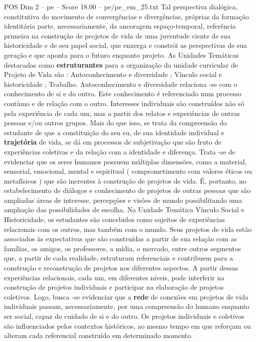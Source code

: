 \begin{textsample}{POS Dim 2 – pe – Score 18.00 – pe/pe\_em\_25.txt}
Tal perspectiva dialógica, constitutiva do movimento de convergências e divergências, próprias da formação identitária parte, necessariamente, da ancoragem espaço-temporal, referência primeira na construção de projetos de vida de uma juventude ciente de sua historicidade e de seu papel social, que enxerga e constrói as perspectivas de sua geração e que aponta para o futuro enquanto projeto.
As Unidades Temáticas destacadas como \textbf{estruturantes} para a organização da unidade curricular de Projeto de Vida são : Autoconhecimento e diversidade ; Vínculo social e historicidade ; Trabalho.
Autoconhecimento e diversidade relaciona -se com o conhecimento de si e do outro.
Este conhecimento é referenciado num processo contínuo e de relação com o outro.
Interesses individuais são construídos não só pela experiência de cada um, mas a partir dos relatos e experiências de outras pessoas e/ou outros grupos.
Mais do que isso, se trata da compreensão do estudante de que a constituição do seu eu, de sua identidade individual e \textbf{trajetória} de vida, se dá em processos de subjetivação que são fruto de experiências coletivas e da relação com a identidade e diferença.
Trata -se de evidenciar que os seres humanos possuem múltiplas dimensões, como a material, sensorial, emocional, mental e espiritual ( comprometimento com valores éticos ou metafísicos ) que são inerentes à construção de projetos de vida.
É, portanto, no estabelecimento de diálogos e conhecimento de projetos de outras pessoas que são ampliadas áreas de interesse, percepções e visões de mundo possibilitando uma ampliação das possibilidades de escolha.
Na Unidade Temática Vínculo Social e Historicidade, os estudantes são concebidos como sujeitos de experiências relacionais com os outros, mas também com o mundo.
Seus projetos de vida estão associados às expectativas que são construídas a partir de sua relação com as famílias, os amigos, os professores, a mídia, o mercado, entre outros segmentos que, a partir de cada realidade, estruturam referenciais e contribuem para a construção e reconstrução de projetos nos diferentes aspectos.
A partir dessas experiências relacionais, cada um, em diferentes níveis, pode interferir na construção de projetos individuais e participar na elaboração de projetos coletivos.
Logo, busca -se evidenciar que a \textbf{rede} de conexões em projetos de vida individuais passam, necessariamente, por uma compreensão do humano enquanto ser social, capaz do cuidado de si e do outro.
Os projetos individuais e coletivos são influenciados pelos contextos históricos, ao mesmo tempo em que reforçam ou alteram cada referencial construído em determinado momento.

\end{textsample}
